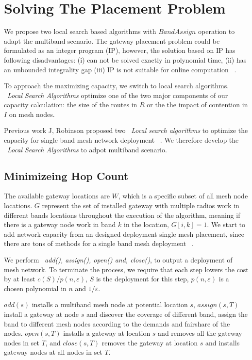 \section{Solving The Placement Problem}
\label{sec:algorithms}

We propose two local search based algorithms with $Band Assign$ operation to adapt the multiband scenario. The gateway placement problem could be formulated as an integer program (IP), however, the solution based on IP has following disadvantages: (i) can not be solved exactly in polynomial time,
   (ii) has an unbounded integrality gap
   (iii) IP is not suitable for online computation ~\cite{robinson2008adding}.

   To approach the maximizing capacity, we switch to local search algorithms.
   ~\emph{Local Search Algorithms} optimize one of the two major components of our capacity calculation: the size of the routes in $R$ or the the impact of contention in $I$ on mesh nodes.

   Previous work J, Robinson proposed two ~\emph{Local search algorithms} to optimize the capacity for single band mesh network deployment ~\cite{robinson2008adding}.
   We therefore develop the ~\emph{Local Search Algorithms} to adpot multiband scenario.

   \subsection{Minimizeing Hop Count}

   The available gateway locations are $W$, which is a specific subset of all mesh node locations. $G$ represent the set of installed gateway with multiple radios work in different bands locations throughout the execution of the algorithm, meaning if there is a gateway node work in band $k$ in the location, $G[i,k]=1$.
   We start to add network capacity from an designed deployment single mesh placement, since there are tons of methods for a single band mesh deployment ~\cite{akyildiz2005wireless}.


   We perform ~\emph{add(), assign(), open() and, close()}, to output a deployment of mesh network. 
   To terminate the process, we require that each step lowers the cost by at least $c(S)/p(n,\varepsilon)$, $S$ is the deployment for this step, $p(n,\varepsilon)$ is a chosen polynomial in $n$ and $1/ \varepsilon$.


   $add(s)$ installs a multiband mesh node at potential location $s$, $assign(s,T)$ install a gateway at node $s$ and discover the coverage of different band, assign the band to different mesh nodes according to the demands and fairshare of the nodes. $open(s,T)$ installs a gateway at location $s$ and removes all the gateway nodes in set $T$, and $close(s,T)$ removes the gateway at location $s$ and installs gateway nodes at all nodes in set $T$.

